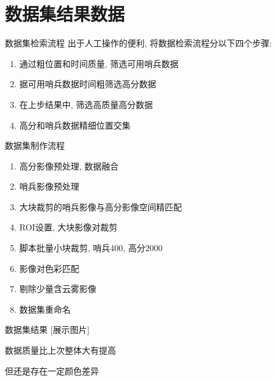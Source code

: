 \section{数据集结果数据}
\begin{frame}{数据集检索流程}
    出于人工操作的便利, 将数据检索流程分以下四个步骤:
    \begin{enumerate}
        \item 通过粗位置和时间质量, 筛选可用哨兵数据
        \item 据可用哨兵数据时间粗筛选高分数据
        \item 在上步结果中, 筛选高质量高分数据
        \item 高分和哨兵数据精细位置交集
    \end{enumerate}
\end{frame}

\begin{frame}{数据集制作流程}
    \begin{enumerate}
        \item 高分影像预处理, 数据融合
        \item 哨兵影像预处理
        \item 大块裁剪的哨兵影像与高分影像空间精匹配
        \item ROI设置, 大块影像对裁剪
        \item 脚本批量小块裁剪, 哨兵400, 高分2000
        \item 影像对色彩匹配
        \item 剔除少量含云雾影像
        \item 数据集重命名
    \end{enumerate}
\end{frame}

\begin{frame}{数据集结果}
    [展示图片]

    数据质量比上次整体大有提高
    
    但还是存在一定颜色差异
\end{frame}